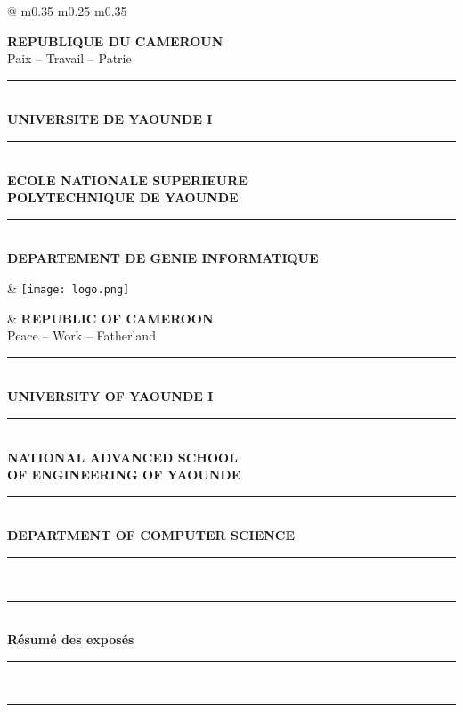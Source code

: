 \documentclass[11pt,a4paper]{article}
\newcommand{\HRule}{\rule{\linewidth}{1pt}}
\newcommand{\DoubleHRule}{\rule{\linewidth}{1.5pt}\\[-0.3em]\rule{\linewidth}{0.8pt}}
\begin{document}
	\thispagestyle{empty} %
	
	\begin{tcolorbox}[
		colback=blue!5,
		colframe=blue!50,
		boxrule=0.8pt,
		arc=4mm,
		left=4mm, right=4mm, top=2mm, bottom=2mm
		]
		
		\begin{tabular*}{\textwidth}{@{\extracolsep{\fill}} m{0.35\textwidth} m{0.25\textwidth} m{0.35\textwidth} }
			
			\centering
			\textbf{REPUBLIQUE DU CAMEROUN}\\
			Paix -- Travail -- Patrie\\
			\HRule \\[0.3em]
			\textbf{UNIVERSITE DE YAOUNDE I}\\
			\HRule \\[0.3em]
			\textbf{ECOLE NATIONALE SUPERIEURE\\POLYTECHNIQUE DE YAOUNDE}\\
			\HRule \\[0.3em]
			\textbf{DEPARTEMENT DE GENIE INFORMATIQUE}
			
			&
			\centering
			\texttt{[image: logo.png]}
			
			&
			\centering
			\textbf{REPUBLIC OF CAMEROON}\\
			Peace -- Work -- Fatherland\\
			\HRule \\[0.3em]
			\textbf{UNIVERSITY OF YAOUNDE I}\\
			\HRule \\[0.3em]
			\textbf{NATIONAL ADVANCED SCHOOL\\OF ENGINEERING OF YAOUNDE}\\
			\HRule \\[0.3em]
			\textbf{DEPARTMENT OF COMPUTER SCIENCE}
			
		\end{tabular*}
	\end{tcolorbox}
	
	\vspace{1.2cm}
	
	\begin{center}
		\DoubleHRule \\[1em]
		{\huge \bfseries Résumé des exposés }\\[1em]
		\DoubleHRule
	\end{center}
	
\end{document}
